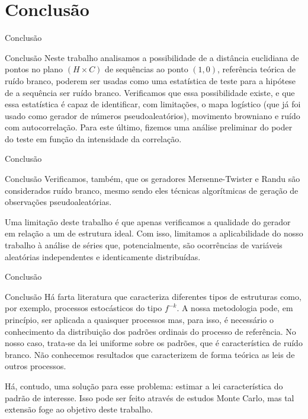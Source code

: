 \documentclass[10pt,xcolor={dvipsnames}]{beamer}
\begin{document}
\section{Conclusão}

\begin{frame}{Conclusão}{}
	\begin{block}{Conclusão}
		Neste trabalho analisamos a possibilidade de a distância euclidiana de pontos no plano $(H\times C)$ de sequências ao ponto $(1,0)$, referência teórica de ruído branco, poderem ser usadas como uma estatística de teste para a hipótese de a sequência ser ruído branco.
		Verificamos que essa possibilidade existe, e que essa estatística é capaz de identificar, com limitações, o mapa logístico (que já foi usado como gerador de números pseudoaleatórios), movimento browniano e ruído com autocorrelação.
		Para este último, fizemos uma análise preliminar do poder do teste em função da intensidade da correlação.
	\end{block}
\end{frame}

\begin{frame}{Conclusão}{}
	\begin{block}{Conclusão}
	Verificamos, também, que os geradores Mersenne-Twister e Randu são considerados ruído branco, mesmo sendo eles técnicas algorítmicas de geração de observações pseudoaleatórias.
	\pause
	
	Uma limitação deste trabalho é que apenas verificamos a qualidade do gerador em relação a um de estrutura ideal.
	Com isso, limitamos a aplicabilidade do nosso trabalho à análise de séries que, potencialmente, são ocorrências de variáveis aleatórias independentes e identicamente distribuídas.	
	\end{block}
\end{frame}

\begin{frame}{Conclusão}{}
	\begin{block}{Conclusão}
	Há farta literatura que caracteriza diferentes tipos de estruturas como, por exemplo, processos estocásticos do tipo $f^{-k}$.
	A nossa metodologia pode, em princípio, ser aplicada a quaisquer processos mas, para isso, é necessário o conhecimento da distribuição dos padrões ordinais do processo de referência.
	No nosso caso, trata-se da lei uniforme sobre os padrões, que é característica de ruído branco.
	Não conhecemos resultados que caracterizem de forma teórica as leis de outros processos.
	\pause
	
	Há, contudo, uma solução para esse problema: estimar a lei característica do padrão de interesse.
	Isso pode ser feito através de estudos Monte Carlo, mas tal extensão foge ao objetivo deste trabalho.
	\end{block}
\end{frame}
\end{document}

